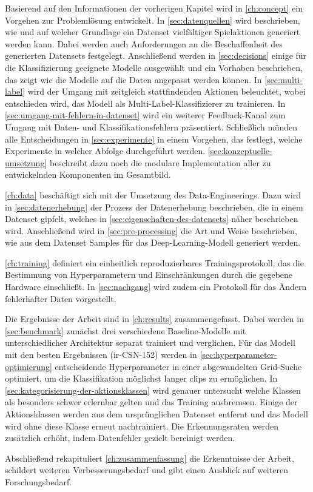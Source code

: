 Basierend auf den Informationen der vorherigen Kapitel wird in \autoref{ch:concept} ein Vorgehen zur Problemlösung entwickelt.
In \autoref{sec:datenquellen} wird beschrieben, wie und auf welcher Grundlage ein Datenset vielfältiger Spielaktionen generiert werden kann.
Dabei werden auch Anforderungen an die Beschaffenheit des generierten Datensets festgelegt.
Anschließend werden in \autoref{sec:decisions} einige für die Klassifizierung geeignete Modelle ausgewählt und ein Vorhaben beschrieben, das zeigt wie die Modelle auf die Daten angepasst werden können.
In \autoref{sec:multi-label} wird der Umgang mit zeitgleich stattfindenden Aktionen beleuchtet, wobei entschieden wird, das Modell als Multi-Label-Klassifizierer zu trainieren.
In \autoref{sec:umgang-mit-fehlern-in-datenset} wird ein weiterer Feedback-Kanal zum Umgang mit Daten- und Klassifikationsfehlern präsentiert.
Schließlich münden alle Entscheidungen in \autoref{sec:experimente} in einem Vorgehen, das festlegt, welche Experimente in welcher Abfolge durchgeführt werden.
\autoref{sec:konzeptuelle-umsetzung} beschreibt dazu noch die modulare Implementation aller zu entwickelnden Komponenten im Gesamtbild.

\autoref{ch:data} beschäftigt sich mit der Umsetzung des Data-Engineerings.
Dazu wird in \autoref{sec:datenerhebung} der Prozess der Datenerhebung beschrieben, die in einem Datenset gipfelt, welches in \autoref{sec:eigenschaften-des-datensets} näher beschrieben wird.
Anschließend wird in \autoref{sec:pre-processing} die Art und Weise beschrieben, wie aus dem Datenset Samples für das Deep-Learning-Modell generiert werden.

\autoref{ch:training} definiert ein einheitlich reproduzierbares Trainingsprotokoll, das die Bestimmung von Hyperparametern und Einschränkungen durch die gegebene Hardware einschließt.
In \autoref{sec:nachgang} wird zudem ein Protokoll für das Ändern fehlerhafter Daten vorgestellt.

Die Ergebnisse der Arbeit sind in \autoref{ch:results} zusammengefasst.
Dabei werden in \autoref{sec:benchmark} zunächst drei verschiedene Baseline-Modelle mit unterschiedlicher Architektur separat trainiert und verglichen.
Für das Modell mit den besten Ergebnissen (ir-CSN-152) werden in \autoref{sec:hyperparameter-optimierung} entscheidende Hyperparameter in einer abgewandelten Grid-Suche optimiert, um die Klassifikation möglichst langer \glspl{clip} zu ermöglichen.
In \autoref{sec:kategorisierung-der-aktionsklassen} wird genauer untersucht welche Klassen als besonders schwer erlernbar gelten und das Training ausbremsen.
Einige der Aktionsklassen werden aus dem ursprünglichen Datenset entfernt und das Modell wird ohne diese Klasse erneut nachtrainiert.
Die Erkennungsraten werden zusätzlich erhöht, indem \zB Datenfehler gezielt bereinigt werden.

Abschließend rekapituliert \autoref{ch:zusammenfassung} die Erkenntnisse der Arbeit, schildert weiteren Verbesserungsbedarf und gibt einen Ausblick auf weiteren Forschungsbedarf.
